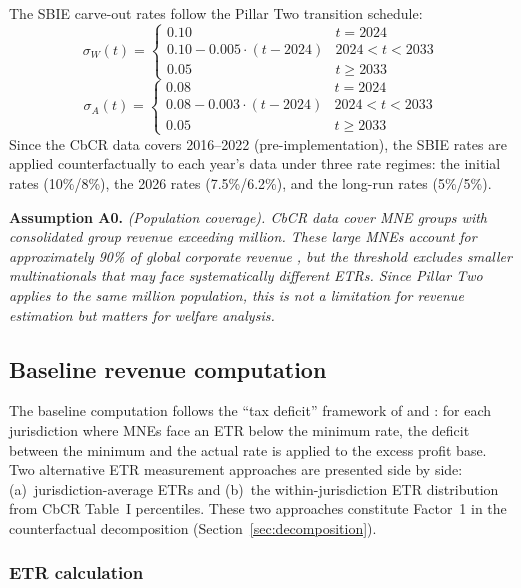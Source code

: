 \documentclass[11pt,a4paper]{article}
\newcommand{\EUR}{\texteuro}
\newcommand{\assumption}[2]{\noindent\textbf{Assumption #1.} \textit{#2}\medskip}
\begin{document}
The SBIE carve-out rates follow the Pillar Two transition schedule:
\begin{equation}\label{eq:sbie_rates_W}
\sigma_W(t) = \begin{cases} 0.10 & t = 2024 \\ 0.10 - 0.005 \cdot (t - 2024) & 2024 < t < 2033 \\ 0.05 & t \geq 2033 \end{cases}
\end{equation}
\begin{equation}\label{eq:sbie_rates_A}
\sigma_A(t) = \begin{cases} 0.08 & t = 2024 \\ 0.08 - 0.003 \cdot (t - 2024) & 2024 < t < 2033 \\ 0.05 & t \geq 2033 \end{cases}
\end{equation}
Since the CbCR data covers 2016--2022 (pre-implementation), the SBIE rates are applied counterfactually to each year's data under three rate regimes: the initial rates (10\%/8\%), the 2026 rates (7.5\%/6.2\%), and the long-run rates (5\%/5\%).

\assumption{A0}{(Population coverage). CbCR data cover MNE groups with consolidated group revenue exceeding \EUR750 million. These large MNEs account for approximately 90\% of global corporate revenue \citep{hugger2026}, but the threshold excludes smaller multinationals that may face systematically different ETRs. Since Pillar Two applies to the same \EUR750 million population, this is not a limitation for revenue estimation but matters for welfare analysis.}

\subsection{Baseline revenue computation}\label{sec:baseline}

The baseline computation follows the ``tax deficit'' framework of \citet{clausing2021} and \citet{barake2022}: for each jurisdiction where MNEs face an ETR below the minimum rate, the deficit between the minimum and the actual rate is applied to the excess profit base. Two alternative ETR measurement approaches are presented side by side: (a)~jurisdiction-average ETRs and (b)~the within-jurisdiction ETR distribution from CbCR Table~I percentiles. These two approaches constitute Factor~1 in the counterfactual decomposition (Section~\ref{sec:decomposition}).

\subsubsection{ETR calculation}\label{sec:etr}
\end{document}

